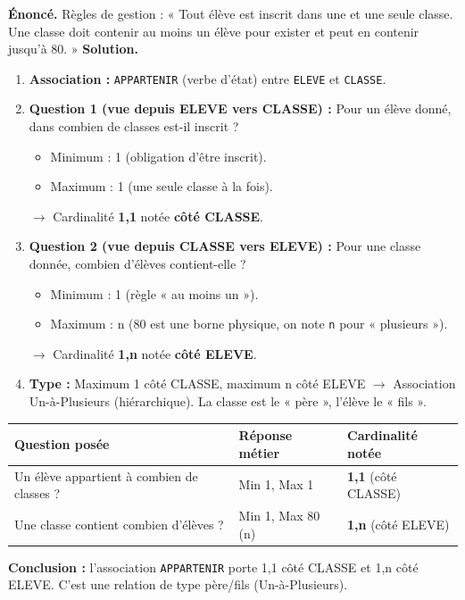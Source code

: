 \documentclass[11pt]{article}
\newcommand{\cle}[1]{{\popxbold\color{popdark}#1}}
\begin{document}
\begin{exoresolu}
\textbf{Énoncé.} Règles de gestion : « Tout élève est inscrit dans une et une seule classe. Une classe doit contenir au moins un élève pour exister et peut en contenir jusqu'à 80. »
\tcblower
\textbf{Solution.}
\begin{enumerate}
  \item \textbf{Association :} \texttt{APPARTENIR} (verbe d'état) entre \texttt{ELEVE} et \texttt{CLASSE}.
  \item \textbf{Question 1 (vue depuis ELEVE vers CLASSE) :} Pour un élève donné, dans combien de classes est-il inscrit ?
  \begin{itemize}
    \item Minimum : 1 (obligation d'être inscrit).
    \item Maximum : 1 (une seule classe à la fois).
  \end{itemize}
  $\rightarrow$ Cardinalité \textbf{1,1} notée \textbf{côté CLASSE}.
  \item \textbf{Question 2 (vue depuis CLASSE vers ELEVE) :} Pour une classe donnée, combien d'élèves contient-elle ?
  \begin{itemize}
    \item Minimum : 1 (règle « au moins un »).
    \item Maximum : n (80 est une borne physique, on note \texttt{n} pour « plusieurs »).
  \end{itemize}
  $\rightarrow$ Cardinalité \textbf{1,n} notée \textbf{côté ELEVE}.
  \item \textbf{Type :} Maximum 1 côté CLASSE, maximum n côté ELEVE $\rightarrow$ Association \cle{Un-à-Plusieurs} (hiérarchique). La classe est le « père », l'élève le « fils ».
\end{enumerate}
\begin{center}
\begin{tabularx}{\linewidth}{|l|X|X|}
\hline
\rowcolor{popblueL} \textbf{Question posée} & \textbf{Réponse métier} & \textbf{Cardinalité notée} \\
\hline
Un élève appartient à combien de classes ? & Min 1, Max 1 & \textbf{1,1} (côté CLASSE) \\
\hline
Une classe contient combien d'élèves ? & Min 1, Max 80 (n) & \textbf{1,n} (côté ELEVE) \\
\hline
\end{tabularx}
\end{center}
\textbf{Conclusion :} l'association \texttt{APPARTENIR} porte 1,1 côté CLASSE et 1,n côté ELEVE. C'est une relation de type père/fils (Un-à-Plusieurs).
\end{exoresolu}
\end{document}
